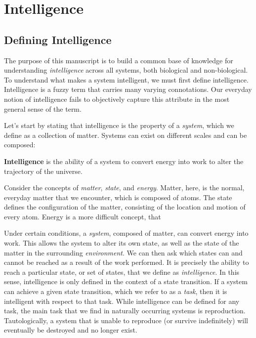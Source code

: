 \chapter{Intelligence}

\section{Defining Intelligence}

The purpose of this manuscript is to build a common base of knowledge for understanding \textit{intelligence} across all systems, both biological and non-biological. To understand what makes a system intelligent, we must first define intelligence. Intelligence is a fuzzy term that carries many varying connotations. Our everyday notion of intelligence fails to objectively capture this attribute in the most general sense of the term.

Let's start by stating that intelligence is the property of a \textit{system}, which we define as a collection of matter. Systems can exist on different scales and can be composed: 

\begin{center}
	\textbf{Intelligence} is the ability of a system to convert energy into work to alter the trajectory of the universe. 
\end{center}

Consider the concepts of \textit{matter}, \textit{state}, and \textit{energy}. Matter, here, is the normal, everyday matter that we encounter, which is composed of atoms. The state defines the configuration of the matter, consisting of the location and motion of every atom. Energy is a more difficult concept, that 


Under certain conditions, a \textit{system}, composed of matter, can convert energy into work. This allows the system to alter its own state, as well as the state of the matter in the surrounding \textit{environment}. We can then ask which states can and cannot be reached as a result of the work performed. It is precisely the ability to reach a particular state, or set of states, that we define as \textit{intelligence}. In this sense, intelligence is only defined in the context of a state transition. If a system can achieve a given state transition, which we refer to as a \textit{task}, then it is intelligent with respect to that task. While intelligence can be defined for any task, the main task that we find in naturally occurring systems is reproduction. Tautologically, a system that is unable to reproduce (or survive indefinitely) will eventually be destroyed and no longer exist.



